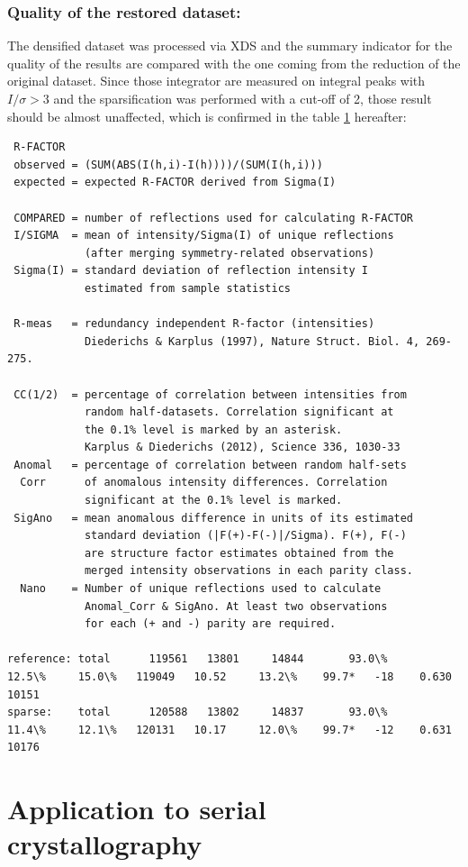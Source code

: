 \documentclass[preprint]{iucr}              %
\begin{document}
\subsubsection{Quality of the restored dataset:} 
The densified dataset was processed via XDS and the summary indicator for the quality of the results are compared with the one coming from the reduction of the original dataset. 
Since those integrator are measured on integral peaks with $I/\sigma>3$ and the sparsification was performed
with a cut-off of 2, those result should be almost unaffected, which is confirmed in the table \ref{} hereafter:
\begin{verbatim}
 R-FACTOR
 observed = (SUM(ABS(I(h,i)-I(h))))/(SUM(I(h,i)))
 expected = expected R-FACTOR derived from Sigma(I)

 COMPARED = number of reflections used for calculating R-FACTOR
 I/SIGMA  = mean of intensity/Sigma(I) of unique reflections
            (after merging symmetry-related observations)
 Sigma(I) = standard deviation of reflection intensity I
            estimated from sample statistics

 R-meas   = redundancy independent R-factor (intensities)
            Diederichs & Karplus (1997), Nature Struct. Biol. 4, 269-275.

 CC(1/2)  = percentage of correlation between intensities from
            random half-datasets. Correlation significant at
            the 0.1% level is marked by an asterisk.
            Karplus & Diederichs (2012), Science 336, 1030-33
 Anomal   = percentage of correlation between random half-sets
  Corr      of anomalous intensity differences. Correlation
            significant at the 0.1% level is marked.
 SigAno   = mean anomalous difference in units of its estimated
            standard deviation (|F(+)-F(-)|/Sigma). F(+), F(-)
            are structure factor estimates obtained from the
            merged intensity observations in each parity class.
  Nano    = Number of unique reflections used to calculate
            Anomal_Corr & SigAno. At least two observations
            for each (+ and -) parity are required.

reference: total      119561   13801     14844       93.0\%      12.5\%     15.0\%   119049   10.52     13.2\%    99.7*   -18    0.630   10151
sparse:    total      120588   13802     14837       93.0\%      11.4\%     12.1\%   120131   10.17     12.0\%    99.7*   -12    0.631   10176
\end{verbatim}
\section{Application to serial crystallography}
\end{document}
